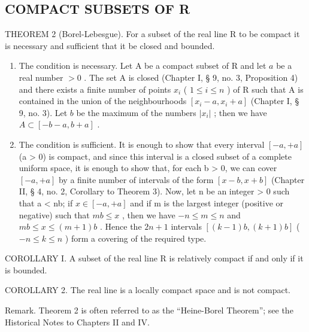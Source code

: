 \subsection{COMPACT SUBSETS OF R}

THEOREM 2 (Borel-Lebesgue). For a subset of the real line R to be compact it is necessary and sufficient that it be closed and bounded.

\begin{enumerate}
\def\labelenumi{\arabic{enumi})}
\item
  The condition is necessary. Let A be a compact subset of R and let \(a\) be a real number \(>0\) . The set A is closed (Chapter I, § 9, no. 3, Proposition 4) and there exists a finite number of points \(x_{i}\) ( \(1 \leqslant i \leqslant n\) ) of R such that A is contained in the union of the neighbourhoods \([x_{i} - a, x_{i} + a]\) (Chapter I, § 9, no. 3). Let \(b\) be the maximum of the numbers \(|x_{i}|\) ; then we have \(A \subset [-b - a, b + a]\) .
\item
  The condition is sufficient. It is enough to show that every interval \([-a, +a]\) (a \textgreater{} 0) is compact, and since this interval is a closed subset of a complete uniform space, it is enough to show that, for each b \textgreater{} 0, we can cover \([-a, +a]\) by a finite number of intervals of the form \([x - b, x + b]\) (Chapter II, § 4, no. 2, Corollary to Theorem 3). Now, let n be an integer \textgreater{} 0 such that a \textless{} nb; if \(x \in [-a, +a]\) and if m is the largest integer (positive or negative) such that \(mb \leqslant x\) , then we have \(-n \leqslant m \leqslant n\) and \(mb \leqslant x \leqslant (m + 1)b\) . Hence the \(2n + 1\) intervals \([(k - 1)b, (k + 1)b]\) ( \(-n \leqslant k \leqslant n\) ) form a covering of the required type.
\end{enumerate}

COROLLARY I. A subset of the real line R is relatively compact if and only if it is bounded.

COROLLARY 2. The real line is a locally compact space and is not compact.

Remark. Theorem 2 is often referred to as the ``Heine-Borel Theorem''; see the Historical Notes to Chapters II and IV.


